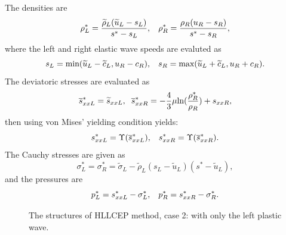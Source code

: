 \documentclass{article}
\numberwithin{equation}{section}
\numberwithin{table}{section}
\begin{document}
The densities are
\begin{equation}
  \rho_L^* = \frac{\widetilde{\rho}_L(\widetilde{u}_L-s_L)}{s^*-s_L}, \hspace{0.3cm}  \rho_R^* = \frac{\rho_R(u_R-s_R)}{s^*-s_R},
\end{equation}
where  the left and right  elastic wave speeds are evaluted as
	\begin{equation}
	  s_L = \text{min} (\widetilde{u}_L-\widetilde{c}_L, u_R-c_R), \hspace{0.3cm} s_R = \text{max}(\widetilde{u}_L+\widetilde{c}_L, u_R+c_R).
	\end{equation}
The deviatoric stresses are evaluated as
\begin{equation}
  \overline{s}_{xxL}^*= \widetilde{s}_{xxL},\hspace{0.2cm}  \overline{s}_{xxR}^*=-\frac{4}{3}\mu\text{ln}(\frac{\rho_R^*}{\rho_R})+s_{xxR},
\end{equation}
then using von Mises' yielding condition yields:
\begin{equation}
  s_{xxL}^* = \Upsilon(\overline{s}_{xxL}^*), \hspace{0.3cm}  s_{xxR}^* = \Upsilon(\overline{s}_{xxR}^*).
\end{equation}
The Cauchy stresses are given as
\begin{equation}
  \sigma_L^*=\sigma_R^*=\widetilde{\sigma}_L -\widetilde{\rho}_L (s_L-\widetilde{u}_L)(s^*-\widetilde{u}_L),
\end{equation}
and the pressures are
\begin{equation}
  p_L^* = s_{xxL}^* - \sigma_L^*, \hspace{0.3cm}   p_R^* = s_{xxR}^* - \sigma_R^*.
\end{equation}

 \begin{figure}
   \centering
{}
\caption{The  structures of HLLCEP method, case 2: with only  the left plastic wave.}
\label{fig:case2}
\end{figure}
\end{document}
